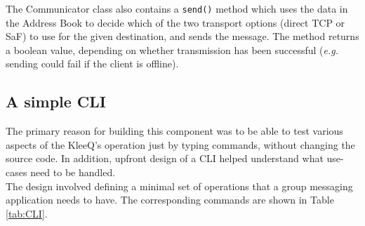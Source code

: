 \documentclass[a4paper, twoside, 12pt]{report}
\begin{document}
The Communicator class also contains a \texttt{send()} method which uses the data in the Address Book to decide which of the two transport options (direct TCP or SaF) to use for the given destination, and sends the message. The method returns a boolean value, depending on whether transmission has been successful (\textit{e.g.} sending could fail if the client is offline).


\subsection{A simple CLI}
\label{subsec:impl.prep.CLI}
The primary reason for building this component was to be able to test various aspects of the KleeQ's operation just by typing commands, without changing the source code. In addition, upfront design of a CLI helped understand what use-cases need to be handled. \\

The design involved defining a minimal set of operations that a group messaging application needs to have. The corresponding commands are shown in Table \ref{tab:CLI}.
\end{document}
